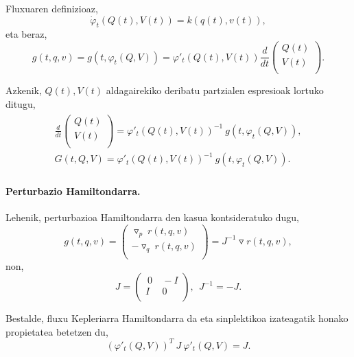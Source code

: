 Fluxuaren definizioaz,
\begin{equation*}
\dot{\varphi}_t (Q(t),V(t))=k(q(t),v(t)),
\end{equation*}
eta beraz,
\begin{equation*}
g(t,q,v)=g(t, \varphi_t(Q,V))=\varphi'_t(Q(t),V(t)) 
\frac{d}{dt}\left(\begin{array}{c}
                Q(t)  \\
                V(t)  \\
\end{array}\right).
\end{equation*}

Azkenik, $Q(t),V(t)$ aldagairekiko deribatu partzialen espresioak lortuko ditugu,
\begin{align}
\begin{split}
\frac{d}{dt}\left(\begin{array}{c}
                Q(t)  \\
                V(t)  \\
\end{array}\right)= \varphi'_t(Q(t),V(t))^{-1} \ g(t, \varphi_t(Q,V)), \\
G(t,Q,V)=\varphi'_t(Q(t),V(t))^{-1} \ g(t, \varphi_t(Q,V)).
\end{split}
\end{align}

\paragraph*{Perturbazio Hamiltondarra.}
Lehenik, perturbazioa Hamiltondarra den kasua kontsideratuko dugu,
\begin{equation*}
g(t,q,v)=
\left(\begin{array}{c}
                \triangledown_p \ r(t,q,v)  \\
                -\triangledown_q \ r(t,q,v)  \\
\end{array}\right)
=J^{-1} \triangledown r(t,q,v),
\end{equation*}
non, 
\begin{equation*}
 J=\left(\begin{array}{cc}
   \ 0 & \ -I \\
     I & \ 0  \\
\end{array}\right), \ \ J^{-1}=-J.
\end{equation*}

Bestalde, fluxu Kepleriarra Hamiltondarra da eta sinplektikoa izateagatik honako propietatea betetzen du,
\begin{equation}
\label{eq:Ksymp}
(\varphi'_t(Q,V))^{T} \ J \ \varphi'_t(Q,V)=J. 
\end{equation}

